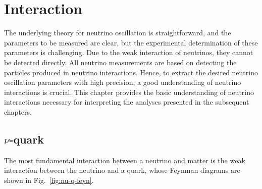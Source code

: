 \section{Interaction}
\label{sec:interaction}
The underlying theory for neutrino oscillation is straightforward, and the parameters to be measured are clear, but the experimental determination of these parameters is challenging.
Due to the weak interaction of neutrinos, they cannot be detected directly.
All neutrino measurements are based on detecting the particles produced in neutrino interactions.
Hence, to extract the desired neutrino oscillation parameters with high precision, a good understanding of neutrino interactions is crucial.
This chapter provides the basic understanding of neutrino interactions necessary for interpreting the analyses presented in the subsequent chapters.

\subsection{$\nu$-quark}
The most fundamental interaction between a neutrino and matter is the weak interaction between the neutrino and a quark, whose Feynman diagrams are shown in Fig.~\ref{fig:nu-q-feyn}.


